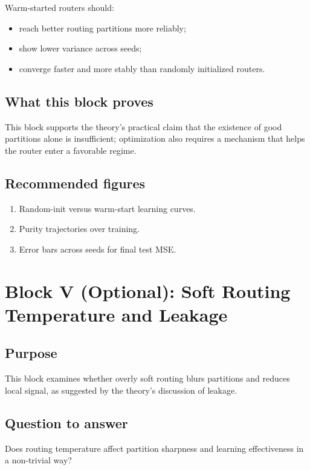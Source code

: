\documentclass[11pt]{article}
\begin{document}
Warm-started routers should:
\begin{itemize}[leftmargin=2em]
    \item reach better routing partitions more reliably;
    \item show lower variance across seeds;
    \item converge faster and more stably than randomly initialized routers.
\end{itemize}

\subsection{What this block proves}

This block supports the theory's practical claim that the existence of good partitions alone is insufficient; optimization also requires a mechanism that helps the router enter a favorable regime.

\subsection{Recommended figures}

\begin{enumerate}[leftmargin=2em]
    \item Random-init versus warm-start learning curves.
    \item Purity trajectories over training.
    \item Error bars across seeds for final test MSE.
\end{enumerate}

\section{Block V (Optional): Soft Routing Temperature and Leakage}

\subsection{Purpose}

This block examines whether overly soft routing blurs partitions and reduces local signal, as suggested by the theory's discussion of leakage.

\subsection{Question to answer}

Does routing temperature affect partition sharpness and learning effectiveness in a non-trivial way?
\end{document}
